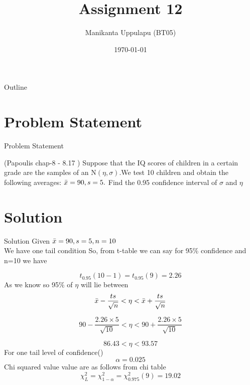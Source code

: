 \documentclass{beamer}
\title{Assignment 12}
\author{Manikanta Uppulapu (BT05)}
\date{\today}
\begin{document}
\begin{frame}
    \titlepage 
\end{frame}

\begin{frame}{Outline}
    \tableofcontents
\end{frame}


\section{Problem Statement}
\begin{frame}{Problem Statement}

\begin{block}{(Papoulis chap-8 - 8.17 )}
Suppose that the IQ scores of children in a certain grade are the samples of an N$({\eta,\sigma})$.We test 10 children and obtain the following averages: $\Bar{x} = 90, s = 5.$
Find the 0.95 confidence interval of $\sigma$  and  $\eta$
\end{block}
\end{frame}


\section{Solution}
\begin{frame}{Solution}
Given $\Bar{x}=90,s=5,n=10$\\
We have one tail condition
So, from t-table we can say for 95\% confidence and n=10 we have

    $$ t_{0.95}(10-1)=t_{0.95}(9)=2.26 $$
As we know
so 95\% of $\eta$ will lie between
\begin{equation}
   \Bar{x}-\frac{ts}{\sqrt{n}} < \eta < \Bar{x} + \frac{ts}{\sqrt{n}}
\end{equation}
\end{frame} 

\begin{frame}
\begin{equation}
   90-\frac{2.26\times 5}{\sqrt{10}} < \eta < 90 + \frac{2.26\times 5}{\sqrt{10}}
\end{equation}

\begin{equation}
    86.43 < \eta < 93.57
\end{equation}
For one tail level of confidence(\alpha)\\ 
\begin{equation}
    \alpha=0.025
\end{equation}
Chi squared value value are as follows from chi table
\begin{equation}
    \chi_{L}^2=\chi_{1-\alpha}^2=\chi_{0.975}^2(9)=19.02
\end{equation}
\end{frame}
\end{document}
